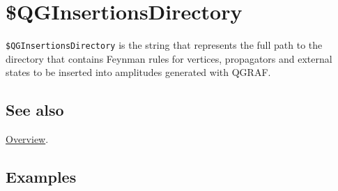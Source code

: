\documentclass[../FeynHelpersManual.tex]{subfiles}
\begin{document}
\hypertarget{dollarqginsertionsdirectory}{
\section{\$QGInsertionsDirectory}\label{dollarqginsertionsdirectory}}

\texttt{\$QGInsertionsDirectory} is the string that represents the full
path to the directory that contains Feynman rules for vertices,
propagators and external states to be inserted into amplitudes generated
with QGRAF.

\subsection{See also}

\hyperlink{toc}{Overview}.

\subsection{Examples}
\end{document}
